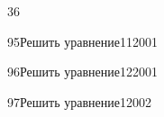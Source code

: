 \begin{TrigSourcePage}{36}
\begin{TrigExercise}{95}{Решить уравнение}{11}{2001}
\end{TrigExercise}
\begin{TrigExercise}{96}{Решить уравнение}{12}{2001}
\end{TrigExercise}
\begin{TrigExercise}{97}{Решить уравнение}{1}{2002}
\end{TrigExercise}
\end{TrigSourcePage}

